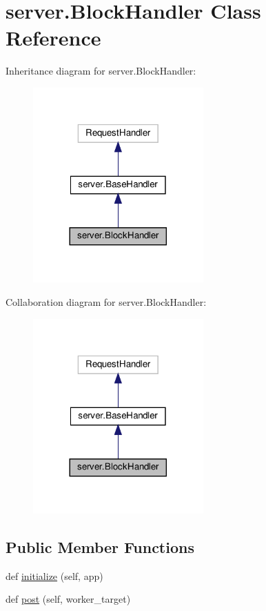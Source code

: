 \hypertarget{classserver_1_1BlockHandler}{}\section{server.\+Block\+Handler Class Reference}
\label{classserver_1_1BlockHandler}


Inheritance diagram for server.\+Block\+Handler\+:
\nopagebreak
\begin{figure}[H]
\begin{center}
\leavevmode
\includegraphics[width=185pt]{classserver_1_1BlockHandler__inherit__graph}
\end{center}
\end{figure}


Collaboration diagram for server.\+Block\+Handler\+:
\nopagebreak
\begin{figure}[H]
\begin{center}
\leavevmode
\includegraphics[width=185pt]{classserver_1_1BlockHandler__coll__graph}
\end{center}
\end{figure}
\subsection*{Public Member Functions}
\begin{DoxyCompactItemize}
\item 
def \hyperlink{classserver_1_1BlockHandler_a292141ced99cfa63ae7434480cb82ac4}{initialize} (self, app)
\item 
def \hyperlink{classserver_1_1BlockHandler_a0c9197b9bce91acb74d1a2da95554d49}{post} (self, worker\+\_\+target)
\end{DoxyCompactItemize}
